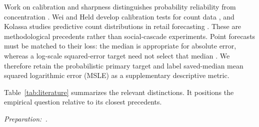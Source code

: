 Work on calibration and sharpness distinguishes probability reliability from concentration \cite{calibration2007}. Wei and Held develop calibration tests for count data \cite{wei2014}, and Kolassa studies predictive count distributions in retail forecasting \cite{kolassa2016}. These are methodological precedents rather than social-cascade experiments. Point forecasts must be matched to their loss: the median is appropriate for absolute error, whereas a log-scale squared-error target need not select that median \cite{gneiting2011}. We therefore retain the probabilistic primary target and label saved-median mean squared logarithmic error (MSLE) as a supplementary descriptive metric.

Table~\ref{tab:literature} summarizes the relevant distinctions. It positions the empirical question relative to its closest precedents.

 {\small\textit{Preparation:~\cite{openai2026}.}}
